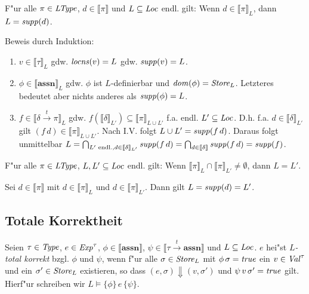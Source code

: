 \documentclass[12pt,a4paper,bigheadings]{scrartcl}
\newcommand{\semantic}[1]{\ensuremath{\llbracket#1\rrbracket}}
\newcommand{\assn}{\ensuremath{\mathbf{assn}}}
\newcommand{\locns}{\name{locns}}
\newcommand{\supp}{\name{supp}}
\newcommand{\tto}{\ensuremath{\xrightarrow{t}}}
\newcommand{\TC}[4]{#1 \models \{#2\}\,#3\,\{#4\}}
\begin{document}
\begin{lemma}[Support]
  F"ur alle $\pi\in{\text{\it LType\/}}$, $d\in\semantic{\pi}$ und $L \subseteq {\text{\it Loc\/}}$ endl. gilt:
  Wenn $d \in \semantic{\pi}_L$, dann $L = \supp(d)$.
\end{lemma}

\begin{beweis}
  Beweis durch Induktion:
  \begin{enumerate}
    \item $v \in \semantic{\tau}_L$ gdw. $\locns(v) = L$ gdw. $\supp(v) = L$.

    \item $\phi \in \semantic{\assn}_L$ gdw. $\phi$ ist $L$-definierbar und ${\text{\it dom\/}}(\phi) = {\text{\it Store\/}}_L$.
          Letzteres bedeutet aber nichts anderes als $\supp(\phi) = L$.

    \item $f \in \semantic{\delta \tto \pi}_L$ gdw. $f(\semantic{\delta}_{L'}) \subseteq \semantic{\pi}_{L\cup L'}$
          f.a. endl. $L' \subseteq {\text{\it Loc\/}}$. D.h. f.a. $d \in \semantic{\delta}_{L'}$ gilt $(f\,d) \in \semantic{\pi}_{L \cup L'}$.
          Nach I.V. folgt $L \cup L' = \supp(f\,d)$. Daraus folgt unmittelbar
          $L = \bigcap_{L'\text{ endl.}, d\in\semantic{\delta}_{L'}} \supp(f\,d)
             = \bigcap_{d\in\semantic{\delta}} \supp(f\,d) = \supp(f)$.
  \end{enumerate}
\end{beweis}

\begin{korollar}
  F"ur alle $\pi\in{\text{\it LType\/}}$, $L,L' \subseteq {\text{\it Loc\/}}$ endl. gilt:
  Wenn $\semantic{\pi}_L \cap \semantic{\pi}_{L'} \ne \emptyset$, dann $L = L'$.
\end{korollar}

\begin{beweis}
  Sei $d \in \semantic{\pi}$ mit $d \in \semantic{\pi}_L$ und $d \in \semantic{\pi}_{L'}$.
  Dann gilt $L = \supp(d) = L'$.
\end{beweis}


\subsection{Totale Korrektheit}

\begin{definition}
  Seien $\tau\in{\text{\it Type\/}}$, $e\in{\text{\it Exp\/}}^\tau$,
  $\phi \in \semantic{\assn}$, $\psi \in \semantic{\tau \tto \assn}$
  und $L \subseteq {\text{\it Loc\/}}$.
  $e$ hei"st {\em $L$-total korrekt} bzgl. $\phi$ und $\psi$, wenn f"ur alle
  $\sigma\in{\text{\it Store\/}}_L$ mit $\phi\,\sigma={\text{\it true\/}}$ ein $v\in{\text{\it Val\/}}^\tau$ und ein
  $\sigma'\in{\text{\it Store\/}}_L$ existieren, so dass $(e,\sigma) \Downarrow (v,\sigma')$ und
  $\psi\,v\,\sigma'={\text{\it true\/}}$ gilt. Hierf"ur schreiben wir $\TC{L}{\phi}{e}{\psi}$.
\end{definition}
\end{document}
